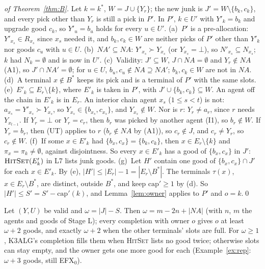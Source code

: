 \documentclass[runningheads,11pt]{llncs}
\newcommand{\efxz}{\texorpdfstring{\mbox{EFX$_0$}}{EFX0}}
\newcommand{\NA}{\mathit{NA}}
\newcommand{\capa}{\mathrm{cap}}
\newcommand{\none}{\bot}
\begin{document}
\begin{proof}[of Theorem~\ref{thm:B}]
Let $k=k^*$, $W=J\cup\{Y_r\}$; the new junk is $J'=W\setminus\{b_k,c_k\}$, and every pick other than $Y_r$ is still a pick in $P'$. In $P'$, $k\in U'$ with $Y'_k=b_k$ and upgrade good $c_k$, so $Y'_u=b_u$ holds for every $u\in U'$.
(a)~$P'$ is a pre-allocation: $Y'_{x_s}\in R_{x_s}$ since $x_s$ needed it, and $b_k,c_k\in W$ are neither picks of $P'$ other than $Y'_k$ nor goods $c_u$ with $u\in U$.
(b)~$\NA'\subseteq\NA$: $Y'_{x_s}\succ Y_{x_s}$ (or $Y_{x_s}=\none$), so $N'_{x_s}\subseteq N_{x_s}$; $k$ had $N_k=\emptyset$ and is now in $U'$.
(c)~Validity: $J'\subseteq W$, $J\cap\NA=\emptyset$ and $Y_r\notin\NA$ (A1), so $J'\cap\NA'=\emptyset$; for $u\in U$, $b_u,c_u\notin\NA\supseteq\NA'$; $b_k,c_k\in W$ are not in $\NA$.
(d)~A terminal $x\notin B^*$ keeps its pick and is a terminal of $P'$ with the same slots.
(e)~$E'_k\subseteq E_r\setminus\{k\}$, where $E'_k$ is taken in $P'$, with $J'\cup\{b_k,c_k\}\subseteq W$. An agent off the chain in $E'_k$ is in $E_r$. An interior chain agent $x_s$ ($1\le s<t$) is not: $a_{x_s}=Y'_{x_s}\succ Y_{x_s}$, so $Y_{x_s}\in\{b_{x_s},c_{x_s}\}$, and $Y_{x_s}\notin W$. Nor is $r$: $Y_r\ne a_r$, since $r$ needs $Y_{x_{t-1}}$. If $Y_r=\none$ or $Y_r=c_r$, then $b_r$ was picked by another agent (I1), so $b_r\notin W$. If $Y_r=b_r$, then (UT) applies to $r$ ($b_r\notin\NA$ by (A1)), so $c_r\notin J$, and $c_r\ne Y_r$, so $c_r\notin W$.
(f)~If some $x\in E'_k$ had $\{b_x,c_x\}=\{b_k,c_k\}$, then $x\in E_r\setminus\{k\}$ and $\pi_x=\pi_k\ne\emptyset$, against disjointness. So every $x\in E'_k$ has a good of $\{b_x,c_x\}$ in $J'$: $\textsc{HitSet}(E'_k)$ in L7 lists junk goods.
(g)~Let $H'$ contain one good of $\{b_x,c_x\}\cap J'$ for each $x\in E'_k$. By (e), $|H'|\le|E_r|-1=|E_r\setminus B^*|$. The terminals $\tau(x)$, $x\in E_r\setminus B^*$, are distinct, outside $B^*$, and keep $\capa'\ge1$ by (d). So $|H'|\le S'=S'-\capa'(k)$, and Lemma~\ref{lem:owner} applies to $P'$ and $o=k$.\qed
\end{proof}

\begin{proposition}\label{prop:size}
Let $(Y,U)$ be valid and $\omega=|J|-S$. Then $\omega=m-2n+|\NA|$ (with $n$, $m$ the agents and goods of Stage L); every completion with owner $o$ gives $o$ at least $\omega+2$ goods, and exactly $\omega+2$ when the other terminals' slots are full. For $\omega\ge1$, K3ALG's completion fills them when {\upshape\textsc{HitSet}} lists no good twice; otherwise slots can stay empty, and the owner gets one more good for each (Example~\ref{ex:rep}: $\omega+3$ goods, still \efxz{}).
\end{proposition}
\end{document}
